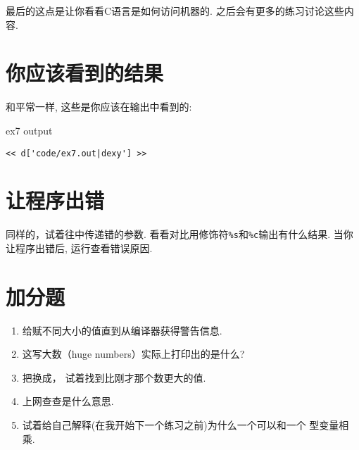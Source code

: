 最后的这点是让你看看C语言是如何访问机器的. 之后会有更多的练习讨论这些内容.


\section{你应该看到的结果}

和平常一样, 这些是你应该在输出中看到的:

\begin{code}{ex7 output}
\begin{lstlisting}
<< d['code/ex7.out|dexy'] >>
\end{lstlisting}
\end{code}


\section{让程序出错}

同样的，试着往中传递错的参数.  
 看看对比用修饰符\verb|%s|和\verb|%c|输出有什么结果. 当你让程序出错后, 运行查看错误原因.

\section{加分题}

\begin{enumerate}
\item 给赋不同大小的值直到从编译器获得警告信息.
\item 这写大数（huge numbers）实际上打印出的是什么?
\item 把换成， 试着找到比刚才那个数更大的值.
\item 上网查查是什么意思.
\item 试着给自己解释(在我开始下一个练习之前)为什么一个可以和一个 型变量相乘.
\end{enumerate}

